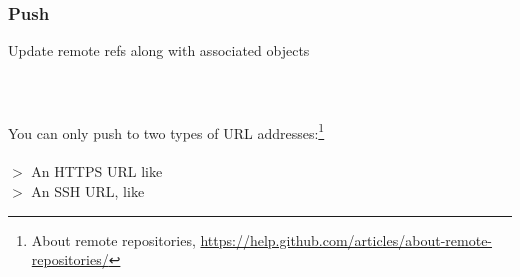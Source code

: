 
\subsubsection{Push}

Update remote refs along with associated objects
\\
\\
\\
\\
You can only push to two types of URL addresses:\footnote{About remote repositories,
\href{https://help.github.com/articles/about-remote-repositories/}{https://help.github.com/articles/about-remote-repositories/}}
\\
\\
$>$ An HTTPS URL like \\
$>$ An SSH URL, like \\
